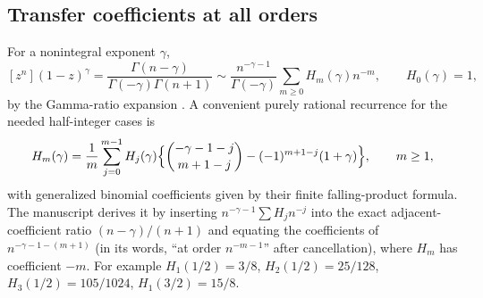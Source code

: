 \documentclass[11pt]{article}
\theoremstyle{definition}\newtheorem{definition}[theorem]{Definition}
\theoremstyle{remark}\newtheorem{remark}[theorem]{Remark}
\begin{document}
\subsection{Transfer coefficients at all orders}
For a nonintegral exponent $\gamma$,
\begin{equation}\label{bit:cert:eq:binomialgamma}
 [z^n](1-z)^\gamma
 =\frac{\Gamma(n-\gamma)}{\Gamma(-\gamma)\Gamma(n+1)}
 \sim\frac{n^{-\gamma-1}}{\Gamma(-\gamma)}
      \sum_{m\ge0}H_m(\gamma)n^{-m},\qquad H_0(\gamma)=1,
\end{equation}
by the Gamma-ratio expansion \cite[Chapter~VI]{fs}. A convenient purely
rational recurrence for the needed half-integer cases is
\begin{equation}\label{bit:cert:eq:Hrec}
 H_m(\gamma)=\frac1m\sum_{j=0}^{m-1}H_j(\gamma)
 \Bigl\{\binom{-\gamma-1-j}{m+1-j}
       -(-1)^{m+1-j}(1+\gamma)\Bigr\},\qquad m\ge1,
\end{equation}
with generalized binomial coefficients given by their finite falling-product
formula. The manuscript derives it by inserting $n^{-\gamma-1}\sum H_jn^{-j}$
into the exact adjacent-coefficient ratio $(n-\gamma)/(n+1)$ and equating the
coefficients of $n^{-\gamma-1-(m+1)}$ (in its words, ``at order $n^{-m-1}$''
after cancellation), where $H_m$ has coefficient $-m$. For example
$H_1(1/2)=3/8$, $H_2(1/2)=25/128$, $H_3(1/2)=105/1024$, $H_1(3/2)=15/8$.
\end{document}
